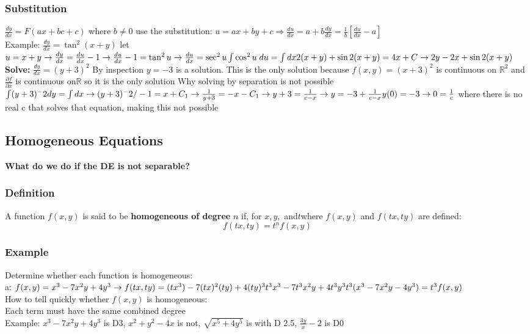 \documentclass{article}
\begin{document}
\subsubsection{Substitution} $\frac{dy}{dx} = F(ax+bc+c)$ where $b\neq 0$ use the substitution: $u=ax+by+c \Rightarrow \frac{du}{dx} = a+b\frac{dy}{dx} = \frac{1}{b}\left[\frac{du}{dx}-a\right]$
\\Example: $\frac{dy}{dx} = \tan^2(x+y)$ let $u=x+y \rightarrow \frac{dy}{dx}=\frac{du}{dx}-1 \rightarrow \frac{du}{dx}-1=\tan^2 u \rightarrow \frac{du}{dx} = \sec ^2 u \\ \int \cos^2 u \; du = \int dx \\ 2(x+y)+\sin2(x+y) = 4x+C \rightarrow 2y-2x+\sin2(x+y)$
\\ \textbf{Solve:}
$\frac{dy}{dx} = (y+3)^2$ By inspection $y=-3$ is a solution. This is the only solution because $f(x,y)=(x+3)^2$ is continuous on $\mathbb{R}^2$ and $\frac{\partial f}{\partial x}$ is continuous on$ \mathbb{R}$ so it is the only solution
Why solving by separation is not possible
$\int (y+3)^-2 dy=\int dx \rightarrow (y+3)^-2/-1=x+C_1 \rightarrow \frac{1}{y+3}=-x-C_1 \rightarrow y+3 = \frac{1}{c-x} \rightarrow y=-3+\frac{1}{c-x}
\\y(0)=-3\rightarrow 0=\frac{1}{c}$ where there is no real c that solves that equation, making this not possible
\subsection{Homogeneous Equations} 
\textbf{What do we do if the DE is not separable?}
\subsubsection{Definition} A function $f(x,y)$ is said to be \textbf{homogeneous of degree} $n$ if, for $x, y,$ and$ t $where $f(x,y)$ and $f(tx,ty)$ are defined: \\$$f(tx,ty)=t^nf(x,y)$$
\subsubsection{Example} Determine whether each function is homogeneous: \\
a: $ f(x,y)=x^3-7x^2y+4y^3 \rightarrow f(tx,ty)=(tx^3)-7(tx)^2(ty)+4(ty)^3\\t^3x^3-7t^3x^2y+4t^3y^3\\t^3(x^3-7x^2y-4y^3)=t^3f(x,y)$
\\How to tell quickly whether $f(x,y)$ is homogeneous:
\\Each term must have the same combined degree
\\Example: $x^3-7x^2y+4y^3$ is D3, $x^2+y^2-4x$ is not, $\sqrt{x^5+4y^5}$ is with D 2.5, $\frac{3y}{x}-2$ is D0
\end{document}
